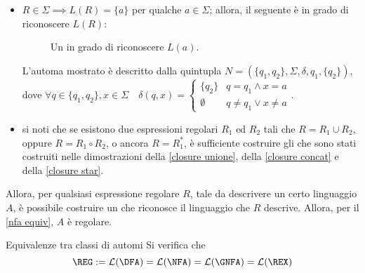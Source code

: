 \documentclass[a4paper, 12pt]{report}
\begin{document}
{\begin{itemize}
                L'automa mostrato è descritto dalla quintupla $N = (\{q_0\}, \Sigma, \delta, q_0, \{q_0\})$, dove $\forall a \in \Sigma \quad \delta(q_0, a) = \emptyset$.

            \item $R \in \Sigma \implies L(R) = \{a \}$ per qualche $a \in \Sigma$; allora, il seguente \NFA è in grado di riconoscere $L(R)$:

                \begin{figure}[H]
                    \centering
                    \caption{Un \NFA in grado di riconoscere $L(a)$.}
                \end{figure}

                L'automa mostrato è descritto dalla quintupla $N = (\{q_1, q_2\}, \Sigma, \delta, q_1, \{q_2\})$, dove $\forall q \in \{q_1, q_2\}, x \in \Sigma \quad \delta(q, x) = \left \{ \begin{array}{ll} \{q_2\} & q = q_1 \land x = a \\ \emptyset & q \neq q_1 \lor x \neq a \end{array} \right.$.

            \item si noti che se esistono due espressioni regolari $R_1$ ed $R_2$ tali che $R = R_1 \cup R_2$, oppure $R = R_1 \circ R_2$, o ancora $R = R_1^*$, è sufficiente costruire gli \NFA che sono stati costruiti nelle dimostrazioni della \cref{closure unione}, della \cref{closure concat} e della \cref{closure star}.
        \end{itemize}

        Allora, per qualsiasi espressione regolare $R$, tale da descrivere un certo linguaggio $A$, è possibile costruire un \NFA che riconosce il linguaggio che $R$ descrive. Allora, per il \cref{nfa equiv}, $A$ è regolare.
    }

    \begin{framedcor}{Equivalenze tra classi di automi}
         Si verifica che $$\mathrm{\REG} := \mathcal{L}(\mathrm{\DFA}) = \mathcal{L}(\mathrm{\NFA}) = \mathcal{L}(\mathrm{\GNFA}) = \mathcal{L}(\REX)$$
    \end{framedcor}
\end{document}
